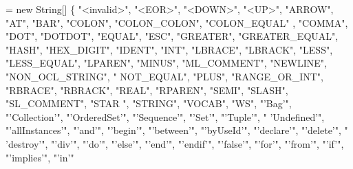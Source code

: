 \begin{DoxyCode}
= \textcolor{keyword}{new} String[] \{
        \textcolor{stringliteral}{"<invalid>"}, \textcolor{stringliteral}{"<EOR>"}, \textcolor{stringliteral}{"<DOWN>"}, \textcolor{stringliteral}{"<UP>"}, \textcolor{stringliteral}{"ARROW"}, \textcolor{stringliteral}{"AT"}, \textcolor{stringliteral}{"BAR"}, \textcolor{stringliteral}{"COLON"}, \textcolor{stringliteral}{"COLON\_COLON"}, \textcolor{stringliteral}{"COLON\_EQUAL"}
      , \textcolor{stringliteral}{"COMMA"}, \textcolor{stringliteral}{"DOT"}, \textcolor{stringliteral}{"DOTDOT"}, \textcolor{stringliteral}{"EQUAL"}, \textcolor{stringliteral}{"ESC"}, \textcolor{stringliteral}{"GREATER"}, \textcolor{stringliteral}{"GREATER\_EQUAL"}, \textcolor{stringliteral}{"HASH"}, \textcolor{stringliteral}{"HEX\_DIGIT"}, \textcolor{stringliteral}{"IDENT"}, \textcolor{stringliteral}{"INT"},
       \textcolor{stringliteral}{"LBRACE"}, \textcolor{stringliteral}{"LBRACK"}, \textcolor{stringliteral}{"LESS"}, \textcolor{stringliteral}{"LESS\_EQUAL"}, \textcolor{stringliteral}{"LPAREN"}, \textcolor{stringliteral}{"MINUS"}, \textcolor{stringliteral}{"ML\_COMMENT"}, \textcolor{stringliteral}{"NEWLINE"}, \textcolor{stringliteral}{"NON\_OCL\_STRING"}, \textcolor{stringliteral}{"
      NOT\_EQUAL"}, \textcolor{stringliteral}{"PLUS"}, \textcolor{stringliteral}{"RANGE\_OR\_INT"}, \textcolor{stringliteral}{"RBRACE"}, \textcolor{stringliteral}{"RBRACK"}, \textcolor{stringliteral}{"REAL"}, \textcolor{stringliteral}{"RPAREN"}, \textcolor{stringliteral}{"SEMI"}, \textcolor{stringliteral}{"SLASH"}, \textcolor{stringliteral}{"SL\_COMMENT"}, \textcolor{stringliteral}{"STAR
      "}, \textcolor{stringliteral}{"STRING"}, \textcolor{stringliteral}{"VOCAB"}, \textcolor{stringliteral}{"WS"}, \textcolor{stringliteral}{"'Bag'"}, \textcolor{stringliteral}{"'Collection'"}, \textcolor{stringliteral}{"'OrderedSet'"}, \textcolor{stringliteral}{"'Sequence'"}, \textcolor{stringliteral}{"'Set'"}, \textcolor{stringliteral}{"'Tuple'"}, \textcolor{stringliteral}{"
      'Undefined'"}, \textcolor{stringliteral}{"'allInstances'"}, \textcolor{stringliteral}{"'and'"}, \textcolor{stringliteral}{"'begin'"}, \textcolor{stringliteral}{"'between'"}, \textcolor{stringliteral}{"'byUseId'"}, \textcolor{stringliteral}{"'declare'"}, \textcolor{stringliteral}{"'delete'"}, \textcolor{stringliteral}{"
      'destroy'"}, \textcolor{stringliteral}{"'div'"}, \textcolor{stringliteral}{"'do'"}, \textcolor{stringliteral}{"'else'"}, \textcolor{stringliteral}{"'end'"}, \textcolor{stringliteral}{"'endif'"}, \textcolor{stringliteral}{"'false'"}, \textcolor{stringliteral}{"'for'"}, \textcolor{stringliteral}{"'from'"}, \textcolor{stringliteral}{"'if'"}, \textcolor{stringliteral}{"'implies'"}, \textcolor{stringliteral}{"'in'"}

\end{DoxyCode}
